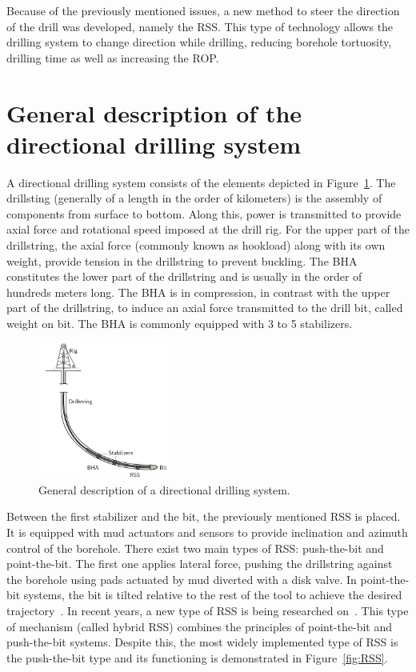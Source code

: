 Because of the previously mentioned issues, a new method to steer the direction of the drill was developed, namely the \acf{RSS}. This type of technology allows the drilling system to change direction while drilling, reducing borehole tortuosity, drilling time as well as increasing the \acf{ROP}.

\section{General description of the directional drilling system}

A directional drilling system consists of the elements depicted in Figure~\ref{fig:directionaldrilling}. The drillsting (generally of a length in the order of kilometers) is the assembly of components from surface to bottom. Along this, power is transmitted to provide axial force and rotational speed imposed at the drill rig. For the upper part of the drillstring, the axial force (commonly known as hookload) along with its own weight, provide tension in the drillstring to prevent buckling. The \acf{BHA} constitutes the lower part of the drillstring and is usually in the order of hundreds meters long. The \acs{BHA} is in compression,  in contrast with the upper part of the drillstring, to induce an axial force transmitted to the drill bit, called weight on bit. The \acs{BHA} is commonly equipped with 3 to 5 stabilizers. 

\begin{figure}[ht]\centering
	\includegraphics[width=0.4\textwidth]{img/drillingsystem.pdf}
	\caption{\label{fig:directionaldrilling}General description of a directional drilling system.}
\end{figure}

Between the first stabilizer and the bit, the previously mentioned \acs{RSS} is placed. It is equipped with mud actuators and sensors to provide inclination and azimuth control of the borehole. There exist two main types of \acs{RSS}: push-the-bit and point-the-bit. The first one applies lateral force, pushing the drillstring against the borehole using pads actuated by mud diverted with a disk valve. In point-the-bit systems, the bit is tilted relative to the rest of the tool to achieve the desired trajectory~\cite{Downton2000}. In recent years, a new type of \acs{RSS} is being researched on~\cite{Felczak2012}. This type of mechanism (called hybrid \acs{RSS}) combines the principles of point-the-bit and push-the-bit systems. Despite this, the most widely implemented type of \acs{RSS} is the push-the-bit type and its functioning is demonstrated in Figure~\ref{fig:RSS}.

